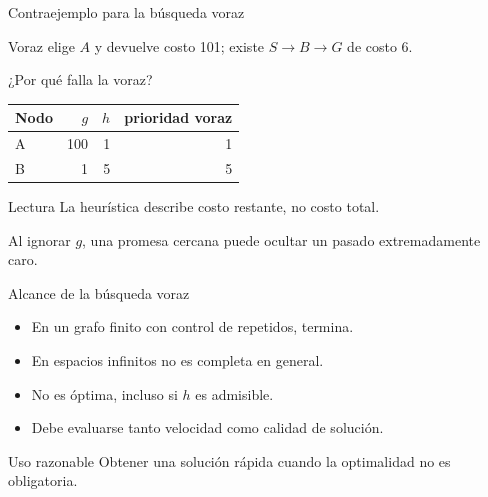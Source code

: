 \documentclass[aspectratio=169,11pt]{beamer}
\begin{document}
\begin{frame}{Contraejemplo para la búsqueda voraz}
  \centering
  \vfill
  Voraz elige $A$ y devuelve costo 101; existe $S\rightarrow B\rightarrow G$ de costo 6.
\end{frame}

\begin{frame}{¿Por qué falla la voraz?}
  \begin{table}
  \begin{tabular}{lrrr}
    \toprule
    Nodo & $g$ & $h$ & prioridad voraz \\\midrule
    A & 100 & 1 & 1 \\
    B & 1 & 5 & 5 \\
    \bottomrule
  \end{tabular}
  \end{table}
  \begin{block}{Lectura}
    La heurística describe costo restante, no costo total.
  \end{block}
  \alert{Al ignorar $g$, una promesa cercana puede ocultar un pasado extremadamente caro.}
\end{frame}

\begin{frame}{Alcance de la búsqueda voraz}
  \begin{itemize}
    \item En un grafo finito con control de repetidos, termina.
    \item En espacios infinitos no es completa en general.
    \item No es óptima, incluso si $h$ es admisible.
    \item Debe evaluarse tanto velocidad como calidad de solución.
  \end{itemize}
  \begin{block}{Uso razonable}
    Obtener una solución rápida cuando la optimalidad no es obligatoria.
  \end{block}
\end{frame}
\end{document}
